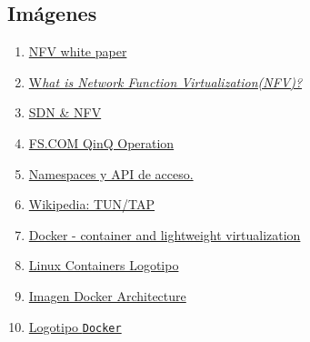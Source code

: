 \documentclass[12pt]{article}
\begin{document}
	\pagebreak

	\subsection*{Imágenes}
	\begin{enumerate}
		\item
		\label{img: nfv vs classic}
		\href{https://portal.etsi.org/nfv/nfv_white_paper.pdf}{NFV white paper}
		
		\item
		\label{img: nfv vs classic 2}
		\href{https://www.ciena.com/insights/articles/What-is-NFV-prx.html}{W\textit{hat is Network Function Virtualization(NFV)?}}
		
		\item
		\label{img: sdn vs nfv osi}
		\href{https://comparacloud.com/servicios-clouds/sdn-y-nfv/}{SDN \& NFV}
		
		\item
		\label{img: frame ethernet 802.1ad}
		\href{https://img-en.fs.com/file/user_manual/s3800-series-qinq-operation.pdf}{FS.COM QinQ Operation}
		
		\item 
		\label{bib:img1}\href{https://8gwifi.org/docs/linux-namespace.jsp}{Namespaces y API de acceso.}
		
		\item
		\label{bib_img: tun tap}
		\href{https://en.wikipedia.org/wiki/TUN/TAP}{Wikipedia: TUN/TAP}
		
		\item
		\label{bib_img: comparativa virt}
		\href{https://www.slideshare.net/janghoonsim/docker-container-and-lightweight-virtualization}{Docker - container and lightweight virtualization}
		
		\item
		\label{bib_img: lxc logo}
		\href{https://linuxcontainers.org/}{Linux Containers Logotipo}
		
		\item
		\label{bib_img: docker arch}
		\href{https://docs.docker.com/get-started/overview/}{Imagen Docker Architecture}
		
		\item
		\label{bib_img: docker logo}
		\href{https://commons.wikimedia.org/wiki/File:Docker_(container_engine)_logo.png}{Logotipo \texttt{Docker}}
		
		
		
	\end{enumerate}
\end{document}

